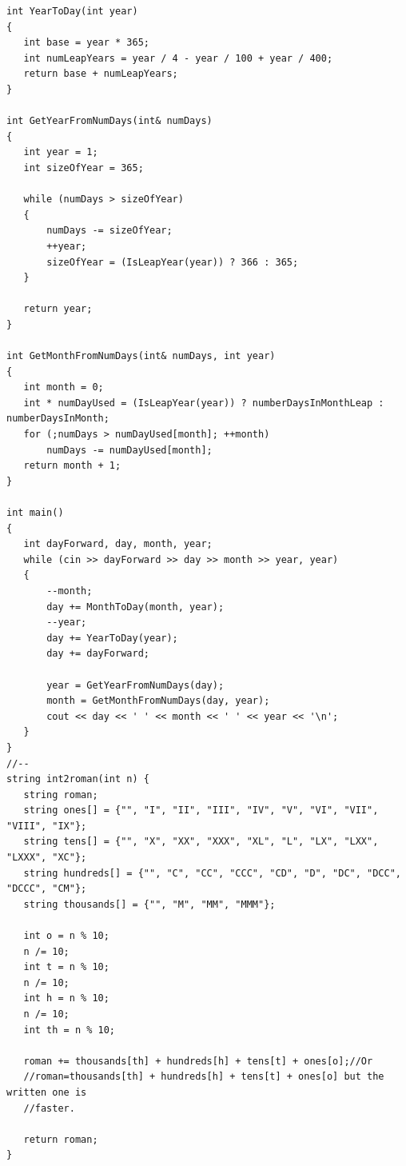 \documentclass[8pt, a4paper, oneside, twocolumn]{extarticle}
\begin{document}
\begin{itemize}
\begin{verbatim}
int YearToDay(int year)
{
   int base = year * 365;
   int numLeapYears = year / 4 - year / 100 + year / 400;
   return base + numLeapYears;
}

int GetYearFromNumDays(int& numDays)
{
   int year = 1;
   int sizeOfYear = 365;

   while (numDays > sizeOfYear)
   {
       numDays -= sizeOfYear;
       ++year;
       sizeOfYear = (IsLeapYear(year)) ? 366 : 365;
   }

   return year;
}

int GetMonthFromNumDays(int& numDays, int year)
{
   int month = 0;
   int * numDayUsed = (IsLeapYear(year)) ? numberDaysInMonthLeap : numberDaysInMonth;
   for (;numDays > numDayUsed[month]; ++month)
       numDays -= numDayUsed[month];
   return month + 1;
}

int main()
{
   int dayForward, day, month, year;
   while (cin >> dayForward >> day >> month >> year, year)
   {
       --month;
       day += MonthToDay(month, year);
       --year;
       day += YearToDay(year);
       day += dayForward;

       year = GetYearFromNumDays(day);
       month = GetMonthFromNumDays(day, year);
       cout << day << ' ' << month << ' ' << year << '\n';
   }
}
//--
string int2roman(int n) {
   string roman;
   string ones[] = {"", "I", "II", "III", "IV", "V", "VI", "VII", "VIII", "IX"};
   string tens[] = {"", "X", "XX", "XXX", "XL", "L", "LX", "LXX", "LXXX", "XC"};
   string hundreds[] = {"", "C", "CC", "CCC", "CD", "D", "DC", "DCC", "DCCC", "CM"};
   string thousands[] = {"", "M", "MM", "MMM"};

   int o = n % 10;
   n /= 10;
   int t = n % 10;
   n /= 10;
   int h = n % 10;
   n /= 10;
   int th = n % 10;

   roman += thousands[th] + hundreds[h] + tens[t] + ones[o];//Or
   //roman=thousands[th] + hundreds[h] + tens[t] + ones[o] but the written one is
   //faster.

   return roman;
}


\end{verbatim}
\end{itemize}
\end{document}
